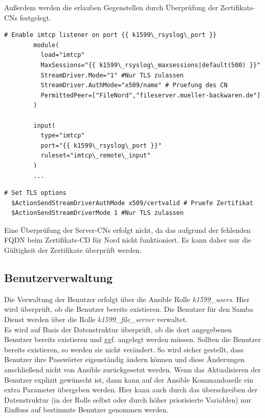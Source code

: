 Außerdem werden die erlauben Gegenstellen durch Überprüfung der Zertifikats-CNs festgelegt.

\begin{lstlisting}[label=code:syslog3,caption=Whitelisting der CN]
        # Enable imtcp listener on port {{ k1599\_rsyslog\_port }}
        module(
          load="imtcp"
          MaxSessions="{{ k1599\_rsyslog\_maxsessions|default(500) }}"
          StreamDriver.Mode="1" #Nur TLS zulassen
          StreamDriver.AuthMode="x509/name" # Pruefung des CN
          PermittedPeer=["FileNord","fileserver.mueller-backwaren.de"]
        )

        input(
          type="imtcp"
          port="{{ k1599\_rsyslog\_port }}"
          ruleset="imtcp\_remote\_input"
        )
        ...
\end{lstlisting}

\begin{lstlisting}[label=code:syslog4,caption=Clientseitige Prüfung in /etc/rsyslog.d/10\_imtcp\_remote\_output.conf.j2]
  # Set TLS options
  $ActionSendStreamDriverAuthMode x509/certvalid # Pruefe Zertifikat
  $ActionSendStreamDriverMode 1 #Nur TLS zulassen
\end{lstlisting}

Eine Überprüfung der Server-CNs erfolgt nicht, da das aufgrund der fehlenden FQDN beim Zertifikats-CD für Nord nicht funktioniert. Es kann daher nur die Gültigkeit der Zertifikate überprüft werden.

\subsection{Benutzerverwaltung}
Die Verwaltung der Benutzer erfolgt über die Ansible Rolle \textit{k1599\_users}. Hier wird überprüft, ob die Benutzer bereits existieren. Die Benutzer für den Samba Dienst werden über die Rolle \textit{k1599\_file\_server} verwaltet. \\

Es wird auf Basis der Datenstruktur  überprüft, ob die dort angegebenen Benutzer bereits existieren und ggf. angelegt werden müssen. Sollten die Benutzer bereits existieren, so werden sie nicht verändert. So wird sicher gestellt, dass Benutzer ihre Passwörter eigenständig ändern können und diese Änderungen anschließend nicht von Ansible zurückgesetzt werden. Wenn das Aktualisieren der Benutzer explizit gewünscht ist, dann kann auf der Ansible Kommandozeile ein extra Parameter  übergeben werden.  Hier kann auch durch das überschreiben der Datenstruktur  (in der Rolle selbst oder durch höher priorisierte Variablen) nur Einfluss auf bestimmte Benutzer genommen werden. 


